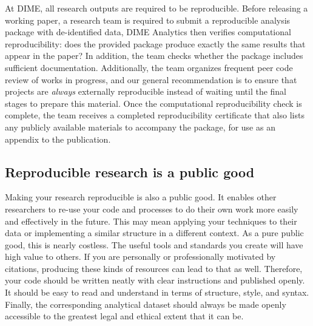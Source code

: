 At DIME, all research outputs are required to be reproducible.
Before releasing a working paper,
a research team is required to submit
a reproducible analysis package with de-identified data,
DIME Analytics then verifies computational reproducibility:
does the provided package produce exactly the same results that appear in the paper?
In addition, the team checks whether the package includes sufficient documentation.
Additionally, the team organizes frequent peer code review of works in progress,
and our general recommendation is to ensure that projects
are \textit{always} externally reproducible
instead of waiting until the final stages to prepare this material.
Once the computational reproducibility check is complete,
the team receives a completed reproducibility certificate
that also lists any publicly available materials to accompany the package,
for use as an appendix to the publication.


\subsection{Reproducible research is a public good}

Making your research reproducible is also a public good.
It enables other researchers to re-use your code and processes
to do their own work more easily and effectively in the future.
This may mean applying your techniques to their data
or implementing a similar structure in a different context.
As a pure public good, this is nearly costless.
The useful tools and standards you create will have high value to others.
If you are personally or professionally motivated by citations,
producing these kinds of resources can lead to that as well.
Therefore, your code should be written neatly with clear instructions and published openly.
It should be easy to read and understand in terms of structure, style, and syntax.
Finally, the corresponding analytical dataset should always be made openly accessible
to the greatest legal and ethical extent that it can be.

